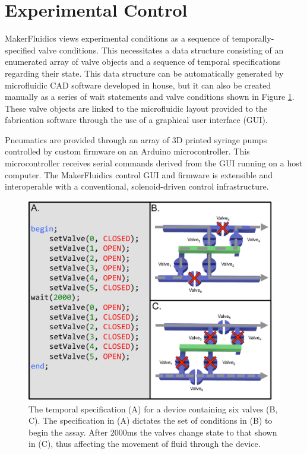 \section{Experimental Control}
\label{sec:mfControl}
MakerFluidics views experimental conditions as a sequence of temporally-specified valve conditions. This necessitates a data structure consisting of an enumerated array of valve objects and a sequence of temporal specifications regarding their state. This data structure can be automatically generated by microfluidic CAD software developed in house, but it can also be created manually as a series of wait statements and valve conditions shown in Figure \ref{fig:sequence}. These valve objects are linked to the microfluidic layout provided to the fabrication software through the use of a graphical user interface (GUI).

Pneumatics are provided through an array of 3D printed syringe pumps controlled by custom firmware on an Arduino microcontroller. This microcontroller receives serial commands derived from the GUI running on a host computer. The MakerFluidics control GUI and firmware is extensible and interoperable with a conventional, solenoid-driven control infrastructure.

\begin{figure}[h]
  \begin{minipage}[t]{0.99\linewidth}\centering
    \includegraphics[width=14cm]{sequence.pdf}
    \medskip
  \end{minipage}\hfill
  \caption[Valving sequence temporal specification]{The temporal specification (A) \cite{thies2008} for a device containing six valves (B, C). The specification in (A) dictates the set of conditions in (B) to begin the assay. After 2000ms the valves change state to that shown in (C), thus affecting the movement of fluid through the device.}
    \label{fig:sequence}
\end{figure}

